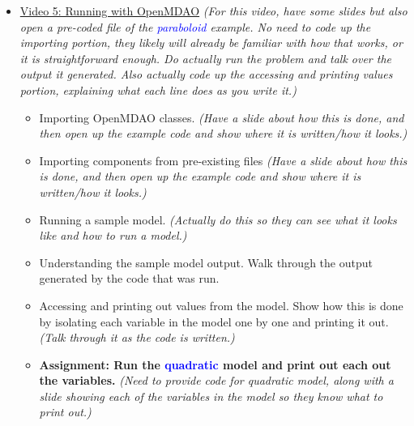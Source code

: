 \documentclass[12pt, letterpaper]{article}
\begin{document}
\begin{itemize}
	\item \underline{Video 5: Running with OpenMDAO} \textit{(For this video, have some slides but also open a pre-coded file of the \textcolor{blue}{paraboloid} example. No need to code up the importing portion, they likely will already be familiar with how that works, or it is straightforward enough. Do actually run the problem and talk over the output it generated. Also actually code up the accessing and printing values portion, explaining what each line does as you write it.)}
		\begin{itemize}
			\item Importing OpenMDAO classes. \textit{(Have a slide about how this is done, and then open up the example code and show where it is written/how it looks.)}
			\item Importing components from pre-existing files \textit{(Have a slide about how this is done, and then open up the example code and show where it is written/how it looks.)}
			\item Running a sample model. \textit{(Actually do this so they can see what it looks like and how to run a model.)}
			\item Understanding the sample model output. Walk through the output generated by the code that was run.
			\item Accessing and printing out values from the model. Show how this is done by isolating each variable in the model one by one and printing it out. \textit{(Talk through it as the code is written.)}
			\item \textbf{Assignment: Run the \textcolor{blue}{quadratic} model and print out each out the variables.} \textit{(Need to provide code for quadratic model, along with a slide showing each of the variables in the model so they know what to print out.)}
		\end{itemize}


\end{itemize}
\end{document}
